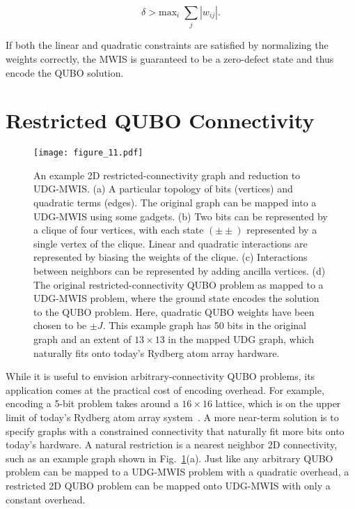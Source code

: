 \begin{equation}\label{eq:QUBO_guarantees}
    \delta>\text{max}_i\;\sum_j|w_{ij}|.
\end{equation}

If both the linear and quadratic constraints are satisfied by normalizing the weights correctly, the MWIS is guaranteed to be a zero-defect state and thus encode the QUBO solution.

\section{Restricted QUBO Connectivity}
\label{sec:restricted_connectivity}

\begin{figure}
    \texttt{[image: figure\_11.pdf]}
    \caption{An example 2D restricted-connectivity graph and reduction to UDG-MWIS. (a) A particular topology of bits (vertices) and quadratic terms (edges). The original graph can be mapped into a UDG-MWIS using some gadgets. (b) Two bits can be represented by a clique of four vertices, with each state $(\pm\pm)$ represented by a single vertex of the clique. Linear and quadratic interactions are represented by biasing the weights of the clique. (c) Interactions between neighbors can be represented by adding ancilla vertices. (d) The original restricted-connectivity QUBO problem as mapped to a UDG-MWIS problem, where the ground state encodes the solution to the QUBO problem. Here, quadratic QUBO weights have been chosen to be $\pm J$. This example graph has 50 bits in the original graph and an extent of $13\times 13$ in the mapped UDG graph, which naturally fits onto today's Rydberg atom array hardware. }
    \label{fig:2d_connectivity}
\end{figure}

While it is useful to envision arbitrary-connectivity QUBO problems, its application comes at the practical cost of encoding overhead. For example, encoding a 5-bit problem takes around a $16 \times 16$ lattice, which is on the upper limit of today's Rydberg atom array system~\cite{Ebadi2022}. A more near-term solution is to specify graphs with a constrained connectivity that naturally fit more bits onto today's hardware. A natural restriction is a nearest neighbor 2D connectivity, such as an example graph shown in Fig.~\ref{fig:2d_connectivity}(a). Just like any arbitrary QUBO problem can be mapped to a UDG-MWIS problem with a quadratic overhead, a restricted 2D QUBO problem can be mapped onto UDG-MWIS with only a constant overhead.

